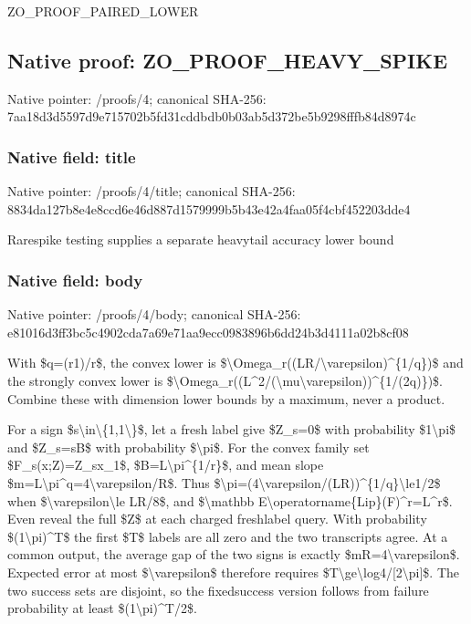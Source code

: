 \documentclass[10pt,a4paper]{article}
\begin{document}
ZO\_PROOF\_PAIRED\_LOWER


\subsection{Native proof: ZO\_PROOF\_HEAVY\_SPIKE}


Native pointer: /proofs/4; canonical SHA-256: 7aa18d3d5597d9e715702b5f\allowbreak{}d31cddbdb0b03ab5d372be5b\allowbreak{}9298fffb84d8974c



\subsubsection{Native field: title}


Native pointer: /proofs/4/title; canonical SHA-256: 8834da127b8e4e8ccd6e46d8\allowbreak{}87d1579999b5b43e42a4faa0\allowbreak{}5f4cbf452203dde4


Rarespike testing supplies a separate heavytail accuracy lower bound


\subsubsection{Native field: body}


Native pointer: /proofs/4/body; canonical SHA-256: e81016d3ff3bc5c4902cda7a\allowbreak{}69e71aa9ecc0983896b6dd24\allowbreak{}b3d4111a02b8cf08


With \$q=(r1)/r\$, the convex lower is \$\textbackslash{}Omega\_r((LR/\textbackslash{}varepsilon)\textasciicircum{}\{1/q\})\$ and the strongly convex lower is \$\textbackslash{}Omega\_r((L\textasciicircum{}2/(\textbackslash{}mu\textbackslash{}vare\allowbreak{}psilon))\textasciicircum{}\{1/(2q)\})\$. Combine these with dimension lower bounds by a maximum, never a product.

For a sign \$s\textbackslash{}in\textbackslash{}\{1,1\textbackslash{}\}\$, let a fresh label give \$Z\_s=0\$ with probability \$1\textbackslash{}pi\$ and \$Z\_s=sB\$ with probability \$\textbackslash{}pi\$. For the convex family set \$F\_s(x;Z)=Z\_sx\_1\$, \$B=L\textbackslash{}pi\textasciicircum{}\{1/r\}\$, and mean slope \$m=L\textbackslash{}pi\textasciicircum{}q=4\textbackslash{}varepsilon/R\$. Thus \$\textbackslash{}pi=(4\textbackslash{}varepsilon/(LR))\textasciicircum{}\{1/q\}\textbackslash{}le1/2\$ when \$\textbackslash{}varepsilon\textbackslash{}le LR/8\$, and \$\textbackslash{}mathbb E\textbackslash{}operatorname\{Lip\}(F)\textasciicircum{}r=L\textasciicircum{}r\$. Even reveal the full \$Z\$ at each charged freshlabel query. With probability \$(1\textbackslash{}pi)\textasciicircum{}T\$ the first \$T\$ labels are all zero and the two transcripts agree. At a common output, the average gap of the two signs is exactly \$mR=4\textbackslash{}varepsilon\$. Expected error at most \$\textbackslash{}varepsilon\$ therefore requires \$T\textbackslash{}ge\textbackslash{}log4/[2\textbackslash{}pi]\$. The two success sets are disjoint, so the fixedsuccess version follows from failure probability at least \$(1\textbackslash{}pi)\textasciicircum{}T/2\$.
\end{document}
